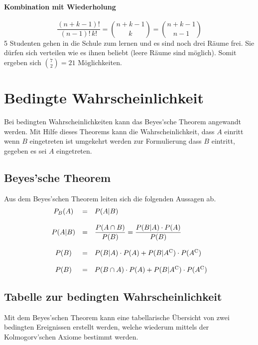 \paragraph{Kombination mit Wiederholung}
\[ 
	\frac{(n+k-1)!}{(n-1)!\, k!} 
	= \binom{n+k-1}{k} 
	= \binom{n+k-1}{n-1} 
\]
5 Studenten gehen in die Schule zum lernen und es sind noch drei 
Räume frei. Sie dürfen sich verteilen wie es ihnen beliebt (leere
Räume sind möglich). Somit ergeben sich $\binom{7}{2}=21$
Möglichkeiten.

\section{Bedingte Wahrscheinlichkeit}
Bei bedingten Wahrscheinlichkeiten kann das \gls{Beyes'sche Theorem} 
angewandt werden. Mit Hilfe dieses Theorems kann die Wahrscheinlichkeit, 
dass $A$ einritt wenn $B$ eingetreten ist umgekehrt werden zur 
Formulierung dass $B$ eintritt, gegeben es sei $A$ eingetreten.


\subsection{Beyes'sche Theorem}
Aus dem Beyes'schen Theorem leiten sich die folgenden Aussagen ab.
\[ \begin{array}{c c l}
	P_B(A) 
		& = 
		& P(A|B) \\
	& & \\
	P(A|B)
		& = 
		& \displaystyle \frac{P(A \cap B)}{P(B)} 
			= \displaystyle 
			\frac{P(B|A) \cdot P(A)}{P(B)} \\
	& & \\
	P(B) 
		& = 
		& P(B|A) \cdot P(A) 
			+ P(B|A^{\mathrm C}) 
			\cdot P(A^{\mathrm C}) \\
	& & \\
	P(B) 	
		& = 
		& P(B \cap A) \cdot P(A) + P(B|A^{\mathrm C}) 
			\cdot P(A^{\mathrm C})
\end{array} \]

\newpage
\subsection{Tabelle zur bedingten Wahrscheinlichkeit}
Mit dem Beyes'schen Theorem kann eine tabellarische Übersicht von
zwei bedingten Ereignissen erstellt werden, welche wiederum mittels
der Kolmogorv'schen Axiome bestimmt werden.

